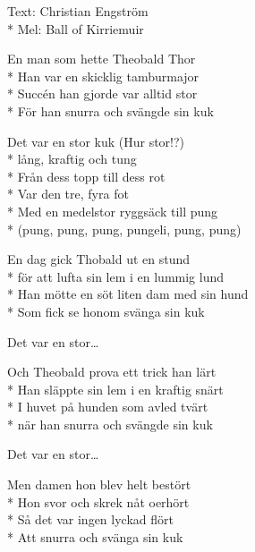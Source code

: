 \begin{SongText}
\begin{SongInfo}
    Text: Christian Engström\\*%
    Mel: Ball of Kirriemuir
\end{SongInfo}
\begin{SongVerse}
En man som hette Theobald Thor\\*%
Han var en skicklig tamburmajor\\*%
Succén han gjorde var alltid stor\\*%
För han snurra och svängde sin kuk
\end{SongVerse}
\begin{SongVerse}
Det var en stor kuk (Hur stor!?)\\*%
lång, kraftig och tung\\*%
Från dess topp till dess rot\\*%
Var den tre, fyra fot\\*%
Med en medelstor ryggsäck till pung\\*%
(pung, pung, pung, pungeli,  pung, pung)
\end{SongVerse}
\begin{SongVerse}
En dag gick Thobald ut en stund\\*%
för att lufta sin lem i en lummig lund\\*%
Han mötte en söt liten dam med sin hund\\*%
Som fick se honom svänga sin kuk
\end{SongVerse}
\begin{SongVerse}
Det var en stor…
\end{SongVerse}
\begin{SongVerse}
Och Theobald prova ett trick han lärt\\*%
Han släppte sin lem i en kraftig snärt\\*%
I huvet på hunden som avled tvärt\\*%
när han snurra och svängde sin kuk
\end{SongVerse}
\begin{SongVerse}
Det var en stor…
\end{SongVerse}
\begin{SongVerse}
Men damen hon blev helt bestört\\*%
Hon svor och skrek nåt oerhört\\*%
Så det var ingen lyckad flört\\*%
Att snurra och svänga sin kuk
\end{SongVerse}

\end{SongText}
